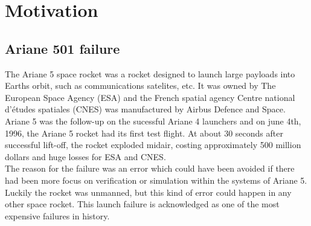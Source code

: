 



\section{Motivation}
\subsection{Ariane 501 failure}
The Ariane 5 space rocket\cite{InquiryBoard1996} was a rocket designed to launch large payloads into Earths orbit, such as communications satelites, etc. It was owned by The European Space Agency (ESA) and the French spatial agency Centre national d'\'etudes spatiales (CNES) was manufactured by Airbus Defence and Space.\\ Ariane 5 was the follow-up on the sucessful Ariane 4 launchers and on june 4th, 1996, the Ariane 5 rocket had its first test flight. At about 30 seconds after successful lift-off, the rocket exploded midair, costing approximately 500 million dollars and huge losses for ESA and CNES. \\ The reason for the failure was an error which could have been avoided if there had been more focus on verification or simulation within the systems of Ariane 5. Luckily the rocket was unmanned, but this kind of error could happen in any other space rocket. This launch failure is acknowledged as one of the most expensive failures in history. \\

